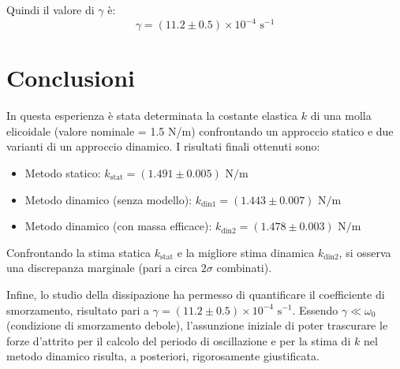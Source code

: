\documentclass[a4paper,12pt]{article}
\begin{document}
Quindi il valore di $\gamma$ è:
\begin{equation*}
    \gamma = (11.2 \pm 0.5) \times 10^{-4}\text{ s}^{-1}
\end{equation*}

\section{Conclusioni}
In questa esperienza è stata determinata la costante elastica $k$ di una molla elicoidale (valore nominale = 1.5 N/m) confrontando un approccio statico e due varianti di un approccio dinamico. I risultati finali ottenuti sono:
\begin{itemize}
    \item Metodo statico: $k_{\text{stat}} = (1.491 \pm 0.005) \text{ N/m}$
    \item Metodo dinamico (senza modello): $k_{\text{din1}} = (1.443 \pm 0.007) \text{ N/m}$
    \item Metodo dinamico (con massa efficace): $k_{\text{din2}} = (1.478 \pm 0.003) \text{ N/m}$
\end{itemize}


Confrontando la stima statica $k_{\text{stat}}$ e la migliore stima dinamica $k_{\text{din2}}$, si osserva una discrepanza marginale (pari a circa $2\sigma$ combinati). 

Infine, lo studio della dissipazione ha permesso di quantificare il coefficiente di smorzamento, risultato pari a $\gamma = (11.2 \pm 0.5) \times 10^{-4}\text{ s}^{-1}$. Essendo $\gamma \ll \omega_0$ (condizione di smorzamento debole), l'assunzione iniziale di poter trascurare le forze d'attrito per il calcolo del periodo di oscillazione e per la stima di $k$ nel metodo dinamico risulta, a posteriori, rigorosamente giustificata.
\end{document}
